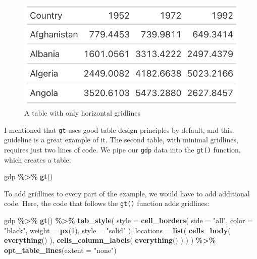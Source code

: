 \documentclass[
]{book}
\newenvironment{Shaded}{\begin{snugshade}}{\end{snugshade}}
\newcommand{\AttributeTok}[1]{\textcolor[rgb]{0.13,0.29,0.53}{#1}}
\newcommand{\DecValTok}[1]{\textcolor[rgb]{0.00,0.00,0.81}{#1}}
\newcommand{\FunctionTok}[1]{\textcolor[rgb]{0.13,0.29,0.53}{\textbf{#1}}}
\newcommand{\NormalTok}[1]{#1}
\newcommand{\SpecialCharTok}[1]{\textcolor[rgb]{0.81,0.36,0.00}{\textbf{#1}}}
\newcommand{\StringTok}[1]{\textcolor[rgb]{0.31,0.60,0.02}{#1}}
\begin{document}
\begin{figure}
\includegraphics[width=1\linewidth]{nostarch/temp/F05002} \caption{A table with only horizontal gridlines}\label{fig:table-horizontal-gridlines}
\end{figure}

I mentioned that \texttt{gt} uses good table design principles by default, and this guideline is a great example of it. The second table, with minimal gridlines, requires just two lines of code. We pipe our \texttt{gdp} data into the \texttt{gt()} function, which creates a table:

\begin{Shaded}
\begin{Highlighting}[]
\NormalTok{gdp }\SpecialCharTok{\%\textgreater{}\%}
  \FunctionTok{gt}\NormalTok{()}
\end{Highlighting}
\end{Shaded}

To add gridlines to every part of the example, we would have to add additional code. Here, the code that follows the \texttt{gt()} function adds gridlines:

\begin{Shaded}
\begin{Highlighting}[]
\NormalTok{gdp }\SpecialCharTok{\%\textgreater{}\%}
  \FunctionTok{gt}\NormalTok{() }\SpecialCharTok{\%\textgreater{}\%}
  \FunctionTok{tab\_style}\NormalTok{(}
    \AttributeTok{style =} \FunctionTok{cell\_borders}\NormalTok{(}
      \AttributeTok{side =} \StringTok{"all"}\NormalTok{,}
      \AttributeTok{color =} \StringTok{"black"}\NormalTok{,}
      \AttributeTok{weight =} \FunctionTok{px}\NormalTok{(}\DecValTok{1}\NormalTok{),}
      \AttributeTok{style =} \StringTok{"solid"}
\NormalTok{    ),}
    \AttributeTok{locations =} \FunctionTok{list}\NormalTok{(}
      \FunctionTok{cells\_body}\NormalTok{(}
        \FunctionTok{everything}\NormalTok{()}
\NormalTok{      ),}
      \FunctionTok{cells\_column\_labels}\NormalTok{(}
        \FunctionTok{everything}\NormalTok{()}
\NormalTok{      )}
\NormalTok{    )}
\NormalTok{  ) }\SpecialCharTok{\%\textgreater{}\%}
  \FunctionTok{opt\_table\_lines}\NormalTok{(}\AttributeTok{extent =} \StringTok{"none"}\NormalTok{)}
\end{Highlighting}
\end{Shaded}
\end{document}
